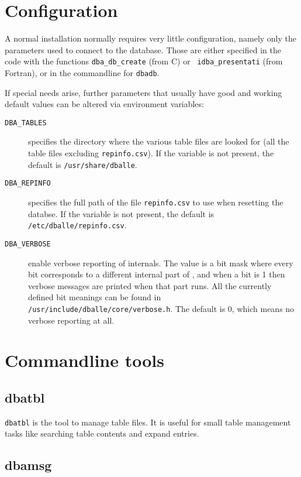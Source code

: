 \section {Configuration}

A normal \dballe{} installation normally requires very little configuration,
namely only the parameters used to connect to the database.  Those are either
specified in the code with the functions {\tt dba\_db\_create} (from C) or {\tt
idba\_presentati} (from Fortran), or in the commandline for {\tt dbadb}.

If special needs arise, further parameters that usually have good and working
default values can be altered via environment variables:

\begin{description}
\item[{\tt DBA\_TABLES}]
  specifies the directory where the various table files are looked for (all the
  table files excluding {\tt repinfo.csv}).  If the variable is not present,
  the default is {\tt /usr/share/dballe}.
\item[{\tt DBA\_REPINFO}]
  specifies the full path of the file {\tt repinfo.csv} to use when resetting
  the databse.  If the variable is not present, the default is
  {\tt /etc/dballe/repinfo.csv}.
\item[{\tt DBA\_VERBOSE}]
  enable verbose reporting of \dballe{} internals.  The value is a bit mask
  where every bit corresponds to a different internal part of \dballe{}, and
  when a bit is 1 then verbose messages are printed when that part runs.  All
  the currently defined bit meanings can be found in
  {\tt /usr/include/dballe/core/verbose.h}.  The default is 0, which means no
  verbose reporting at all.
\end{description}


\section {Commandline tools}

\subsection{dbatbl}

{\tt dbatbl} is the tool to manage table files.  It is useful for small
table management tasks like searching table contents and expand entries.

\subsection{dbamsg}

